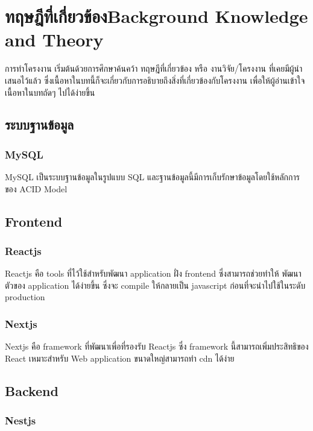 \chapter{\ifcpe ทฤษฎีที่เกี่ยวข้อง\else Background Knowledge and Theory\fi}

การทำโครงงาน เริ่มต้นด้วยการศึกษาค้นคว้า ทฤษฎีที่เกี่ยวข้อง หรือ งานวิจัย/โครงงาน ที่เคยมีผู้นำเสนอไว้แล้ว ซึ่งเนื้อหาในบทนี้ก็จะเกี่ยวกับการอธิบายถึงสิ่งที่เกี่ยวข้องกับโครงงาน เพื่อให้ผู้อ่านเข้าใจเนื้อหาในบทถัดๆ ไปได้ง่ายขึ้น

\section{ระบบฐานข้อมูล}
\subsection{MySQL}

\enskip MySQL เป็นระบบฐานข้อมูลในรูปแบบ SQL และฐานข้อมูลนี้มีการเก็บรักษาข้อมูลโดยใช้หลักการของ ACID Model \cite{acid}

\section{Frontend}

\subsection{Reactjs}

\enskip Reactjs \cite{reactjs} คือ tools ที่ไว้ใช้สำหรับพัฒนา application ฝั่ง frontend ซึ่งสามารถช่วยทำให้ พัฒนาตัวของ application ได้ง่ายขึ้น ซึ่งจะ compile ให้กลายเป็น javascript ก่อนที่จะนำไปใช้ในระดับ production

\subsection{Nextjs}

\enskip Nextjs \cite{nextjs} คือ framework \cite{framework} ที่พัฒนาเพี่อที่รองรับ Reactjs \cite{reactjs} ซึ่ง framework นี้สามารถเพิ่มประสิทธิของ React \cite{reactjs} เหมาะสำหรับ Web application ขนาดใหญ่สามารถทำ cdn \cite{cdn} ได้ง่าย

\section{Backend}

\subsection{Nestjs}


